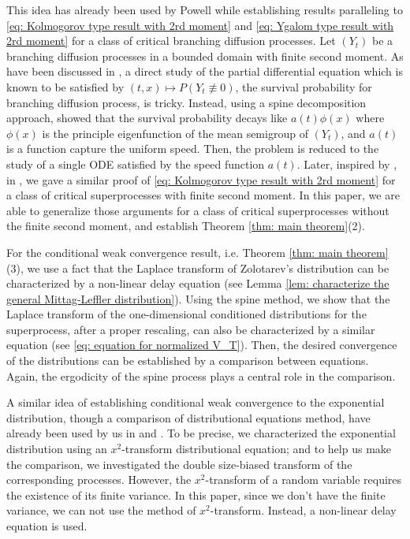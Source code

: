 \documentclass[12pt, a4paper]{amsart}
\theoremstyle{definition}
\numberwithin{equation}{section}
\begin{document}
	This idea has already been used by Powell \cite{Powell2015An-invariance} while establishing results paralleling to \eqref{eq: Kolmogorov type result with 2rd moment} and \eqref{eq: Ygalom type result with 2rd moment} for a class of critical branching diffusion processes. 
	Let $(Y_t)$ be a branching diffusion processes in a bounded domain with finite second moment.
	As have been discussed in \cite{Powell2015An-invariance}, a direct study of the partial differential equation which is known to be satisfied by $(t,x) \mapsto P(Y_t \not\equiv 0)$, the survival probability for branching diffusion process, is tricky.
	Instead, using a spine decomposition approach, \cite{Powell2015An-invariance} showed that the survival probability decays like $a(t)\phi(x)$ where $\phi(x)$ is the principle eigenfunction of the mean semigroup of $(Y_t)$, and $a(t)$ is a function capture the uniform speed. 
	Then, the problem is reduced to the study of a single ODE satisfied by the speed function $a(t)$.
	Later, inspired by \cite{Powell2015An-invariance}, in \cite{RenSongSun2017Spine}, we gave a similar proof of \eqref{eq: Kolmogorov type result with 2rd moment} for a class of critical superprocesses with finite second moment.
	In this paper, we are able to generalize those arguments for a class of critical superprocesses without the finite second moment, and establish Theorem \ref{thm: main theorem}(2).
	
	For the conditional weak convergence result, i.e. Theorem \ref{thm: main theorem}(3), we use a fact that the Laplace transform of Zolotarev's distribution can be characterized by a non-linear delay equation (see Lemma \ref{lem: characterize the general Mittag-Leffler distribution}).
	Using the spine method, we show that the Laplace transform of the one-dimensional conditioned distributions for the superprocess, after a proper rescaling, can also be characterized by a similar equation (see \eqref{eq: equation for normalized V_T}).
	Then, the desired convergence of the distributions can be established by a comparison between equations.	
	Again, the ergodicity of the spine process plays a central role in the comparison.
	
	A similar idea of establishing conditional weak convergence to the exponential distribution, though a comparison of distributional equations method, have already been used by us in \cite{RenSongSun2017A-2-spine} and \cite{RenSongSun2017Spine}. 
	To be precise, we characterized the exponential distribution using an $x^2$-transform distributional equation; and to help us make the comparison, we investigated the double size-biased transform of the corresponding processes.
	However, the $x^2$-transform of a random variable requires the existence of its finite variance. 
	In this paper, since we don't have the finite variance, we can not use the method of $x^2$-transform. 
	Instead, a non-linear delay equation is used.
	
\end{document}
